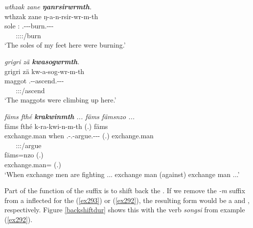 \begin{exe}
	\ex \emph{wthzak zane \textbf{ŋanrsirwrmth}.}\\
	\glll wthzak zane ŋ-a-n-rsir-wr-m-th\\
	sole \Dem:{\Prox} \M.\Alph-\Vc-\Venit-burn.\Ext-\Ndu-\Dur-\Stnsg\\
	~ ~ {\footnotesize \Stpl:\Sbj:\Rpst:\Dur:\Venit/burn}\\
	\trans `The soles of my feet here were burning.' 
	\label{ex293}
\end{exe}
\begin{exe}
	\ex \emph{grigri zä \textbf{kwasogwrmth}.}\\
	\glll grigri zä kw-a-sog-wr-m-th\\
	maggot {\Prox} \M.\Betatwo-\Vc-ascend.\Ext-\Ndu-\Dur-\Stnsg\\
	~ ~ {\footnotesize \Stpl:\Sbj:\Pst:\Dur/ascend}\\
	\trans `The maggots were climbing up here.' 
	\label{ex292}
\end{exe}
\begin{exe}
	\ex \emph{fäms fthé \textbf{krakwinmth} ... fäms fämsnzo ...}\\
	\glll fäms fthé k-ra-kwi-n-m-th (.) fäms\\
	exchange.man when \M.\Bet-\Irr.\Vc-argue.\Ext-\Du-\Dur-\Stnsg{} (.) exchange.man\\
	~ ~ {\footnotesize \Stdu:\Sbj:\Irr:\Ipfv/argue} ~\\
	\sn
	\gll fäms=nzo (.)\\
	exchange.man={\Only} (.)\\
	\trans `When exchange men are fighting ... exchange man (against) exchange man ...' 
	\label{ex294}
\end{exe}

Part of the function of the  suffix is to shift back the . If we remove the \emph{-m} suffix from a  inflected for the   (\ref{ex293}) or   (\ref{ex292}), the resulting form would be a   and  , respectively. Figure \ref{backshiftdur} shows this with the verb \emph{songsi} from example (\ref{ex292}).

